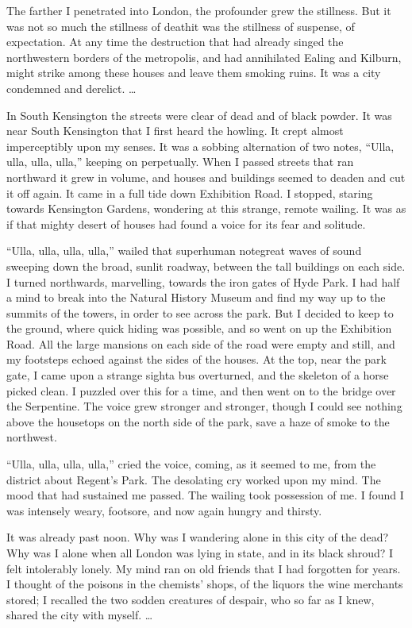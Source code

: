 The farther I penetrated into London, the profounder grew the
stillness. But it was not so much the stillness of death\dash{}it was
the stillness of suspense, of expectation. At any time the
destruction that had already singed the northwestern borders of the
metropolis, and had annihilated Ealing and Kilburn, might strike
among these houses and leave them smoking ruins. It was a city
condemned and derelict. \ldots{}

In South Kensington the streets were clear of dead and of black
powder. It was near South Kensington that I first heard the
howling. It crept almost imperceptibly upon my senses. It was a
sobbing alternation of two notes, ``Ulla, ulla, ulla, ulla,'' keeping
on perpetually. When I passed streets that ran northward it grew in
volume, and houses and buildings seemed to deaden and cut it off
again. It came in a full tide down Exhibition Road. I stopped,
staring towards Kensington Gardens, wondering at this strange,
remote wailing. It was as if that mighty desert of houses had found
a voice for its fear and solitude.

``Ulla, ulla, ulla, ulla,'' wailed that superhuman note\dash{}great waves
of sound sweeping down the broad, sunlit roadway, between the tall
buildings on each side. I turned northwards, marvelling, towards
the iron gates of Hyde Park. I had half a mind to break into the
Natural History Museum and find my way up to the summits of the
towers, in order to see across the park. But I decided to keep to
the ground, where quick hiding was possible, and so went on up the
Exhibition Road. All the large mansions on each side of the road
were empty and still, and my footsteps echoed against the sides of
the houses. At the top, near the park gate, I came upon a strange
sight\dash{}a bus overturned, and the skeleton of a horse picked clean.
I puzzled over this for a time, and then went on to the bridge over
the Serpentine. The voice grew stronger and stronger, though I
could see nothing above the housetops on the north side of the
park, save a haze of smoke to the northwest.

``Ulla, ulla, ulla, ulla,'' cried the voice, coming, as it seemed to
me, from the district about Regent's Park. The desolating cry
worked upon my mind. The mood that had sustained me passed. The
wailing took possession of me. I found I was intensely weary,
footsore, and now again hungry and thirsty.

It was already past noon. Why was I wandering alone in this city of
the dead? Why was I alone when all London was lying in state, and
in its black shroud? I felt intolerably lonely. My mind ran on old
friends that I had forgotten for years. I thought of the poisons in
the chemists' shops, of the liquors the wine merchants stored; I
recalled the two sodden creatures of despair, who so far as I knew,
shared the city with myself. \ldots{}

